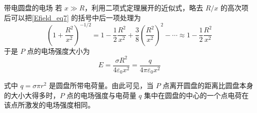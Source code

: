 \begin{example}{带电圆盘的电场}
若 $x\gg R$，利用二项式定理展开的近似式，略去 $R/x$ 的高次项后可以把\autoref{Efield_eq7} 的括号中后一项处理为
\begin{equation}
\left(1+\frac{R^{2}}{x^{2}}\right)^{-1 / 2}=1-\frac{1}{2} \frac{R^{2}}{x^{2}}+\frac{3}{8}\left(\frac{R^{2}}{x^{2}}\right)^{2}-\cdots \approx 1-\frac{1}{2} \frac{R^{2}}{x^{2}}
\end{equation}
于是 $P$ 点的电场强度大小为
\begin{equation}
E=\frac{\sigma R^{2}}{4 \varepsilon_{0} x^{2}} =\frac{q}{4 \pi \varepsilon_{0} x^{2}} 
\end{equation}

式中 $q=\sigma\pi r^2$ 是圆盘所带电荷量。由此可见，当 $P$ 点离开圆盘的距离比圆盘本身的大小大得多时，$ P$ 点的电场强度与电荷量 $q$ 集中在圆盘的中心的一个点电荷在该点所激发的电场强度相同。
\end{example}
